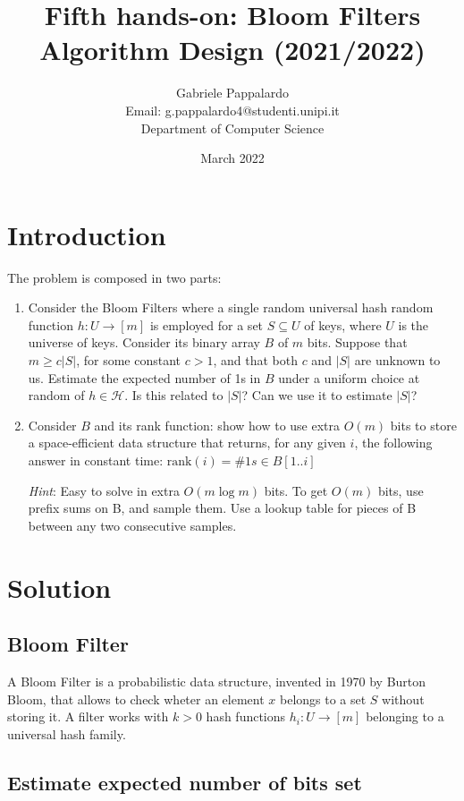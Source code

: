 \documentclass{article}
\title{Fifth hands-on: Bloom Filters \\[1ex] \large Algorithm Design (2021/2022)}
\author{Gabriele Pappalardo\\Email: g.pappalardo4@studenti.unipi.it\\Department of Computer Science}
\date{March 2022}
\begin{document}
\maketitle

\section{Introduction}

The problem is composed in two parts:

\begin{enumerate}
    \item Consider the Bloom Filters where a single random universal hash random function $h : U \to [m]$ is employed for a set $S \subseteq U$ of keys, where $U$ is the universe of keys.
    Consider its binary array $B$ of $m$ bits. Suppose that $m \ge c|S|$, for some constant $c > 1$, and that both $c$ and $|S|$ are unknown to us.   
    Estimate the expected number of 1s in $B$ under a uniform choice at random of $h \in \mathcal{H}$. Is this related to $|S|$? Can we use it to estimate $|S|$? 
    
    \item Consider $B$ and its rank function: show how to use extra $O(m)$ bits to store a space-efficient data structure that returns, for any given $i$, the following answer in constant time: 
    $\textrm{rank}(i) = \#1s \in B[1..i]$
    
    \textit{Hint}: Easy to solve in extra $O(m \log m)$ bits. To get $O(m)$ bits, use prefix sums on B, and sample them. Use a lookup table for pieces of B between any two consecutive samples. 
\end{enumerate}

\section{Solution}

\subsection{Bloom Filter}

A Bloom Filter is a probabilistic data structure, invented in 1970 by Burton Bloom, that allows to check wheter an element $x$ belongs to a set $S$ without storing it.
A filter works with $k > 0$ hash functions $h_i: U \to [m]$ belonging to a universal hash family.

\subsection{Estimate expected number of bits set}
\end{document}
